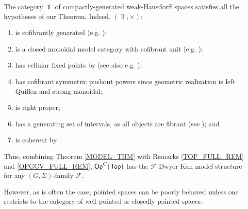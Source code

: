 \documentclass[a4paper,10pt
,draft
]{article}%
\renewcommand{\F}{\mathcal F}
\renewcommand{\1}{\eta}%
\begin{document}
      


\begin{example}
      The category $\Top$ of compactly-generated weak-Hausdorff spaces satisfies all the hypotheses of our Theorem.
      Indeed, $(\Top, \times)$:
      \begin{enumerate}[label = (\roman*)]\itemsep-4pt
      \item is cofibrantly generated (e.g. \cite{Pia91});
      \item is a closed monoidal model category with cofibrant unit (e.g. \cite[Prop. 4.2.11]{Hov99});
      \item has cellular fixed points by \cite{Pia91} (see also e.g. \cite[Lemma 3.18]{Ste16});
      \item has cofibrant symmetric pushout powers since geometric realization is left Quillen and strong monoidal;
      \item is right proper;
      \item has a generating set of intervals, as all objects are fibrant (see \cite[Lemma 2.1]{BM13}); and
      \item is coherent by \cite[Lem. 4.16]{BV73}.
      \end{enumerate}
      Thus, combining Theorem \ref{MODEL_THM} with Remarks \ref{TOP_FULL_REM} and \ref{OPGCV_FULL_REM},
      $\mathsf{Op}^G(\mathsf{Top})$ has the $\F$-Dwyer-Kan model structure for any $(G, \Sigma)$-family $\F$. %

      However, as is often the case, pointed spaces can be poorly behaved unless one restricts to the category of well-pointed or closedly pointed spaces. %
\end{example}
\end{document}
